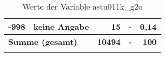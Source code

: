 \begin{longtable}{Xlrrr}
       -998 & keine Angabe & 15 & - & 0,14 \\

     \midrule
     \multicolumn{2}{l}{\textbf{Summe (gesamt)}} & \textbf{10494} & \textbf{-} & \textbf{100} \\
     \bottomrule
     \caption{Werte der Variable astu011k\_g2o}
     \end{longtable}
     
